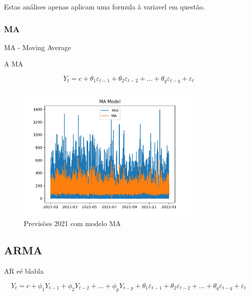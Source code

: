 Estas análises apenas aplicam uma formula à variavel em questão.

\subsubsection{MA}
MA - Moving Average

A MA 


\begin{equation} \label{eq:MA} 
    Y_t = c + \theta_1 \varepsilon_{t-1} + \theta_2 \varepsilon_{t-2} + \dots + \theta_q \varepsilon_{t-q} + \varepsilon_t 
\end{equation}

\begin{figure}[H]
    \centering
    \includegraphics[width=0.8\textwidth]{../plots/MA_model.png}
    \caption{Previsões 2021 com modelo MA}
    \label{fig:MA_model}
\end{figure}
  
\subsection{ARMA}

AR eé blabla

\begin{equation} \label{eq:ARMA}  Y_t = c + \phi_1 Y_{t-1} + \phi_2 Y_{t-2} + \dots + \phi_p Y_{t-p} + \theta_1 \varepsilon_{t-1} + \theta_2 \varepsilon_{t-2} + \dots + \theta_q \varepsilon_{t-q} + \varepsilon_t  \end{equation}

